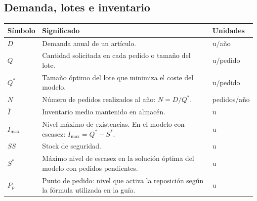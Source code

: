 \documentclass[11pt,a4paper]{article}
\begin{document}
\subsection{Demanda, lotes e inventario}
\begin{longtable}{@{}p{2cm}p{8cm}p{3.5cm}@{}}
    \toprule
    Símbolo    & Significado                                                                            & Unidades    \\
    \midrule
    \endhead
    $D$        & Demanda anual de un artículo.                                                          & u/año       \\
    $Q$        & Cantidad solicitada en cada pedido o tamaño del lote.                                  & u/pedido    \\
    $Q^{*}$    & Tamaño óptimo del lote que minimiza el coste del modelo.                               & u/pedido    \\
    $N$        & Número de pedidos realizados al año: $N=D/Q^{*}$.                                      & pedidos/año \\
    $\bar{I}$  & Inventario medio mantenido en almacén.                                                 & u           \\
    $I_{\max}$ & Nivel máximo de existencias. En el modelo con escasez: $I_{\max}=Q^{*}-S^{*}$.         & u           \\
    $SS$       & Stock de seguridad.                                                                    & u           \\
    $S^{*}$    & Máximo nivel de escasez en la solución óptima del modelo con pedidos pendientes.       & u           \\
    $P_p$      & Punto de pedido: nivel que activa la reposición según la fórmula utilizada en la guía. & u           \\
    \bottomrule
\end{longtable}
\end{document}

